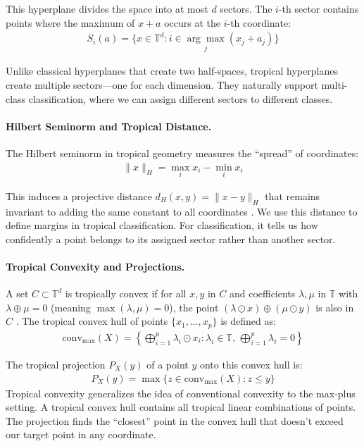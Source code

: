 \documentclass{article}
\newcommand{\trop}{\mathbb{T}}
\begin{document}
This hyperplane divides the space into at most $d$ sectors. The $i$-th sector contains points where the maximum of $x + a$ occurs at the $i$-th coordinate:
\begin{align}
S_i(a) = \{x \in \trop^d : i \in \underset{j}{\arg\max} (x_j + a_j)\}
\end{align}

Unlike classical hyperplanes that create two half-spaces, tropical hyperplanes create multiple sectors—one for each dimension. They naturally support multi-class classification, where we can assign different sectors to different classes.

\paragraph{Hilbert Seminorm and Tropical Distance.}
The Hilbert seminorm in tropical geometry measures the ``spread'' of coordinates:
\begin{align}
\|x\|_H = \max_i x_i - \min_i x_i
\end{align}

This induces a projective distance $d_H(x,y) = \|x - y\|_H$ that remains invariant to adding the same constant to all coordinates \cite{cohen2004}. We use this distance to define margins in tropical classification. For classification, it tells us how confidently a point belongs to its assigned sector rather than another sector.

\paragraph{Tropical Convexity and Projections.}
A set $C \subset \trop^d$ is tropically convex if for all $x,y$ in $C$ and coefficients $\lambda,\mu$ in $\trop$ with $\lambda \oplus \mu = 0$ (meaning $\max(\lambda,\mu)=0$), the point $(\lambda \odot x) \oplus (\mu \odot y)$ is also in $C$ \cite{cohen2004,develin2004}. The tropical convex hull of points $\{x_1,\ldots,x_p\}$ is defined as:
\begin{align}
\text{conv}_{\max}(X) = \left\{\bigoplus_{i=1}^p \lambda_i \odot x_i : \lambda_i \in \trop,\, \bigoplus_{i=1}^p \lambda_i = 0 \right\}
\end{align}

The tropical projection $P_X(y)$ of a point $y$ onto this convex hull is:
\begin{align}
P_X(y) = \max\{z \in \text{conv}_{\max}(X) : z \leq y\}
\end{align}
Tropical convexity generalizes the idea of conventional convexity to the max-plus setting. A tropical convex hull contains all tropical linear combinations of points. The projection finds the ``closest'' point in the convex hull that doesn't exceed our target point in any coordinate.
\end{document}
